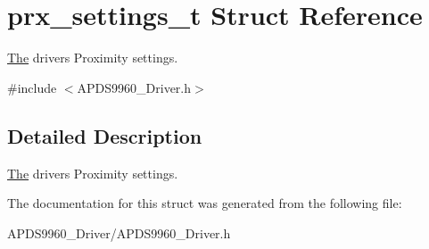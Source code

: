\hypertarget{structprx__settings__t}{}\section{prx\+\_\+settings\+\_\+t Struct Reference}
\label{structprx__settings__t}


\hyperlink{structThe}{The} driver\textquotesingle{}s Proximity settings.  




{\ttfamily \#include $<$A\+P\+D\+S9960\+\_\+\+Driver.\+h$>$}



\subsection{Detailed Description}
\hyperlink{structThe}{The} driver\textquotesingle{}s Proximity settings. 

The documentation for this struct was generated from the following file\+:\begin{DoxyCompactItemize}
\item 
A\+P\+D\+S9960\+\_\+\+Driver/A\+P\+D\+S9960\+\_\+\+Driver.\+h\end{DoxyCompactItemize}
